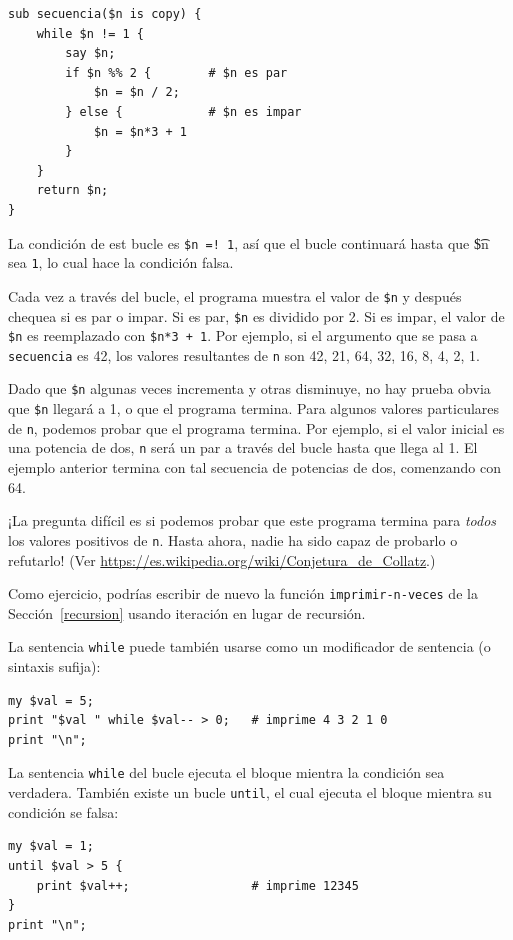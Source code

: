 \begin{lstlisting}
sub secuencia($n is copy) {
    while $n != 1 {
        say $n;
        if $n %% 2 {        # $n es par
            $n = $n / 2;
        } else {            # $n es impar
            $n = $n*3 + 1
        }
    }
    return $n;
}
\end{lstlisting}
%
La condición de est bucle es {\tt \$n =! 1}, así que el bucle continuará
hasta que {\t \$n} sea {\tt 1}, lo cual hace la condición falsa.

Cada vez a través del bucle, el programa muestra el valor de {\tt \$n}
y después chequea si es par o impar. Si es par, {\tt \$n} es dividido por 2.
Si es impar, el valor de {\tt \$n} es reemplazado con {\tt \$n*3 + 1}. Por ejemplo,
si el argumento que se pasa a {\tt secuencia} es 42, los valores resultantes
de {\tt n} son 42, 21, 64, 32, 16, 8, 4, 2, 1. 

Dado que {\tt \$n} algunas veces incrementa y otras disminuye, no hay prueba
obvia que {\tt \$n} llegará a 1, o que el programa termina. Para algunos valores
particulares de {\tt n}, podemos probar que el programa termina. Por ejemplo, si 
el valor inicial es una potencia de dos, {\tt n} será un par a través del bucle
hasta que llega al 1. El ejemplo anterior termina con tal secuencia de potencias
de dos, comenzando con 64.

¡La pregunta difícil es si podemos probar que este programa termina para 
{\em todos} los valores positivos de {\tt n}. Hasta ahora, nadie ha sido capaz
de probarlo o refutarlo! (Ver \url{https://es.wikipedia.org/wiki/Conjetura_de_Collatz}.)

Como ejercicio, podrías escribir de nuevo la función 
\verb|imprimir-n-veces| de la Sección~\ref{recursion}
usando iteración en lugar de recursión.

La sentencia {\tt while} puede también usarse como un modificador de sentencia (o sintaxis sufija):

\begin{lstlisting}
my $val = 5;
print "$val " while $val-- > 0;   # imprime 4 3 2 1 0
print "\n";
\end{lstlisting}

La sentencia {\tt while} del bucle ejecuta el bloque mientra la 
condición sea verdadera. También existe un bucle {\tt until},
el cual ejecuta el bloque mientra su condición se falsa:

\begin{lstlisting}
my $val = 1;
until $val > 5 {
    print $val++;                 # imprime 12345
}
print "\n";
\end{lstlisting}

